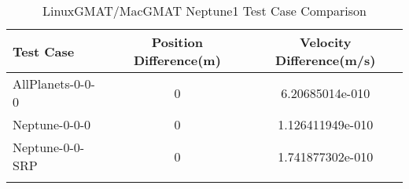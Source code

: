\begin{table}[htbp!]
\centering
\caption{ LinuxGMAT/MacGMAT Neptune1 Test Case Comparison}
      \begin{tabular}{lcc}
      \hline\hline
          Test Case & Position Difference(m) & Velocity Difference(m/s) \\
         \hline
         AllPlanets-0-0-0 & 0 & 6.20685014e-010 \\
         Neptune-0-0-0 & 0 & 1.126411949e-010 \\
         Neptune-0-0-SRP & 0 & 1.741877302e-010 \\
      \hline\hline
      \label{Table: Neptune1 LinuxGMAT-MacGMAT Table} 
\end{tabular}
\end{table}
